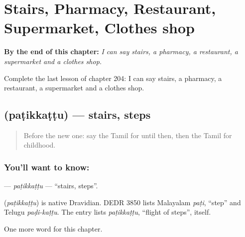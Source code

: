 
\chapter{Stairs, Pharmacy, Restaurant, Supermarket, Clothes shop}
\label{ch:ta-stairs-pharmacy-restaurant-supermarket-clothes-shop}

\begin{chapteropening}
\textbf{By the end of this chapter:} \emph{I can say stairs, a pharmacy, a restaurant, a supermarket and a clothes shop.}

Complete the last lesson of chapter 204: I can say stairs, a pharmacy, a restaurant, a supermarket and a clothes shop.
\end{chapteropening}

\section[\texorpdfstring{\ta{படிக்கட்டு} (paṭikkaṭṭu)}{படிக்கட்டு (paṭikkaṭṭu)}]{ (paṭikkaṭṭu) — stairs, steps}

\label{lesson:TA-C204-patikkattu}



\begin{quote}
Before the new one: say the Tamil for until then, then the Tamil for childhood.
\end{quote}

\subsection*{You'll want to know: }
\textbf{} — \emph{paṭikkaṭṭu} — \textquotedblleft{}stairs, steps\textquotedblright{}.

\begin{cousinweb}
\textbf{} (\emph{paṭikkaṭṭu}) is native Dravidian. DEDR 3850 lists Malayalam \emph{paṭi}, \textquotedblleft{}step\textquotedblright{} and Telugu \emph{paḍi-kaṭṭu}. The entry lists \emph{paṭikkaṭṭu}, \textquotedblleft{}flight of steps\textquotedblright{}, itself.
\end{cousinweb}

\begin{grammarlens}[title={What you've built}]
One more word for this chapter.
\end{grammarlens}

